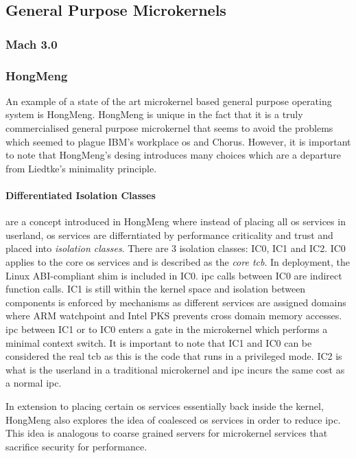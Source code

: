 \documentclass[literature_review.tex]{subfiles}
\begin{document}
\subsection{General Purpose Microkernels}
\subsubsection{Mach 3.0}

\subsubsection{HongMeng}
An example of a state of the art microkernel based general purpose operating system is HongMeng. HongMeng is unique in the fact that it is a truly commercialised general purpose microkernel that seems to avoid the problems which seemed to plague IBM's workplace \gls{os} and Chorus. However, it is important to note that HongMeng's desing introduces many choices which are a departure from Liedtke's minimality principle.

\paragraph{Differentiated Isolation Classes} are a concept introduced in HongMeng where instead of placing all \gls{os} services in userland, \gls{os} services are differntiated by performance criticality and trust and placed into \textit{isolation classes}. There are 3 isolation classes: IC0, IC1 and IC2. IC0 applies to the core \gls{os} services and is described as the \textit{core \gls{tcb}}. In deployment, the Linux ABI-compliant shim is included in IC0. \gls{ipc} calls between IC0 are indirect function calls. IC1 is still within the kernel space and isolation between components is enforced by mechanisms as different services are assigned domains where ARM watchpoint and Intel PKS prevents cross domain memory accesses. \gls{ipc} between IC1 or to IC0 enters a gate in the microkernel which performs a minimal context switch. It is important to note that IC1 and IC0 can be considered the real \gls{tcb} as this is the code that runs in a privileged mode. IC2 is what is the userland in a traditional microkernel and \gls{ipc} incurs the same cost as a normal \gls{ipc}.

In extension to placing certain \gls{os} services essentially back inside the kernel, HongMeng also explores the idea of coalesced \gls{os} services in order to reduce \gls{ipc}. This idea is analogous to coarse grained servers for microkernel services that sacrifice security for performance.
\end{document}
